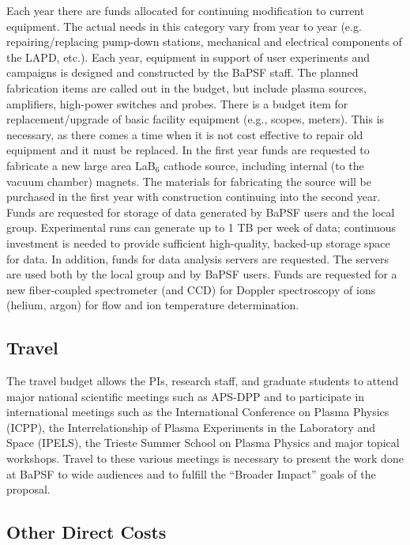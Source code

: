 \documentclass[11pt]{article}
\begin{document}
Each year there
are funds allocated for continuing modification to current equipment. The actual needs in this category
vary from year to year (e.g. repairing/replacing pump-down stations,
mechanical and electrical components of the LAPD, etc.).  Each year, equipment in support of
user experiments and campaigns is designed and constructed by the
BaPSF staff. The planned fabrication items are called out in the
budget, but include plasma sources, amplifiers, high-power switches
and probes.  There is a budget item for replacement/upgrade of basic facility
equipment (e.g., scopes, meters). This is necessary, as there comes a
time when it is not cost effective to repair old equipment and it must
be replaced. In the first year funds are requested to fabricate a new
large area LaB$_6$ cathode source, including internal (to the vacuum
chamber) magnets.  The materials for fabricating the source will be
purchased in the first year with construction continuing into the
second year.  Funds are requested for storage of data generated by
BaPSF users and the local group.  Experimental runs can generate up to 1 TB
per week of data; continuous investment is needed to provide
sufficient high-quality, backed-up storage space for data.  In
addition, funds for data analysis servers are requested.  The servers
are used both by the local group and by BaPSF users.  Funds are
requested for a new fiber-coupled spectrometer (and CCD) for Doppler
spectroscopy of ions (helium, argon) for flow and ion temperature
determination. 


\subsection*{Travel}

The travel budget allows the PIs, research staff, and graduate students
to attend major national scientific meetings such as APS-DPP and to
participate in international meetings such as the International
Conference on Plasma Physics (ICPP), the Interrelationship of Plasma
Experiments in the Laboratory and Space (IPELS), the Trieste Summer
School on Plasma Physics and major topical workshops. Travel to these
various meetings is necessary to present the work done at BaPSF to
wide audiences and to fulfill the “Broader Impact” goals of the
proposal.


\subsection*{Other Direct Costs}
\end{document}
